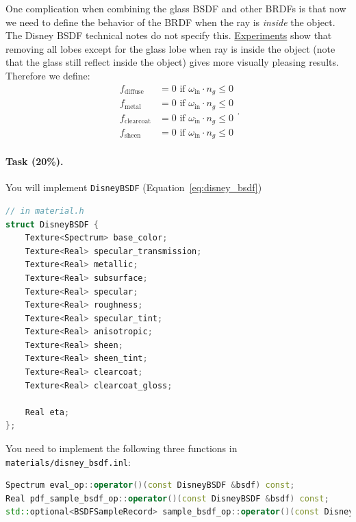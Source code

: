 One complication when combining the glass BSDF and other BRDFs is that now we need to define the
behavior of the BRDF when the ray is \emph{inside} the object. The Disney BSDF technical notes do
not specify this. \href{https://github.com/mmp/pbrt-v3/issues/313}{Experiments} show that removing
all lobes except for the glass lobe when ray is inside the object (note that the glass still reflect
inside the object) gives more visually pleasing results. Therefore we define:
\begin{equation}
\begin{aligned}
	f_{\text{diffuse}} &= 0 \text{ if } \omega_{\text{in}} \cdot n_g \leq 0 \\
	f_{\text{metal}} &= 0 \text{ if } \omega_{\text{in}} \cdot n_g \leq 0 \\
	f_{\text{clearcoat}} &= 0 \text{ if } \omega_{\text{in}} \cdot n_g \leq 0 \\
	f_{\text{sheen}} &= 0 \text{ if } \omega_{\text{in}} \cdot n_g \leq 0
\end{aligned}.
\end{equation}

\paragraph{Task (20\%).} You will implement \lstinline{DisneyBSDF} (Equation~\ref{eq:disney_bsdf})
\begin{lstlisting}[language=c++]
// in material.h
struct DisneyBSDF {
    Texture<Spectrum> base_color;
    Texture<Real> specular_transmission;
    Texture<Real> metallic;
    Texture<Real> subsurface;
    Texture<Real> specular;
    Texture<Real> roughness;
    Texture<Real> specular_tint;
    Texture<Real> anisotropic;
    Texture<Real> sheen;
    Texture<Real> sheen_tint;
    Texture<Real> clearcoat;
    Texture<Real> clearcoat_gloss;

    Real eta;
};
\end{lstlisting}

You need to implement the following three functions in \lstinline{materials/disney_bsdf.inl}:
\begin{lstlisting}[language=c++]
Spectrum eval_op::operator()(const DisneyBSDF &bsdf) const;
Real pdf_sample_bsdf_op::operator()(const DisneyBSDF &bsdf) const;
std::optional<BSDFSampleRecord> sample_bsdf_op::operator()(const DisneyBSDF &bsdf) const;
\end{lstlisting}

